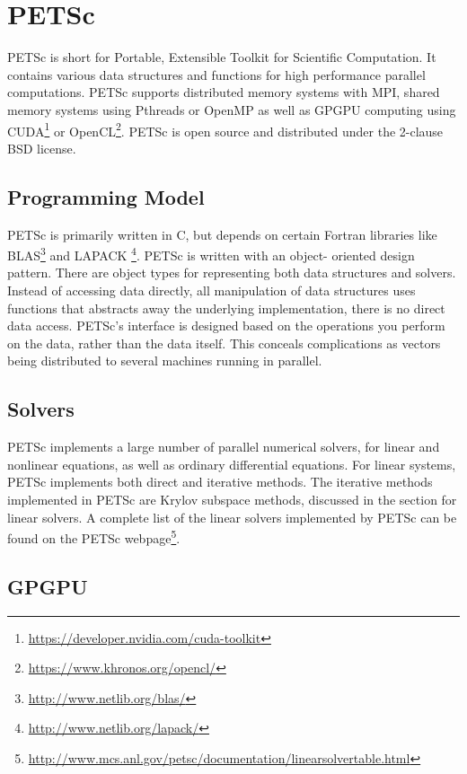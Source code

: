 \section{PETSc}

PETSc is short for Portable, Extensible Toolkit for Scientific Computation. 
It contains various data structures and functions for 
high performance parallel computations. PETSc supports distributed 
memory systems with MPI, shared memory systems using Pthreads or OpenMP as well 
as GPGPU computing using CUDA\footnote{\url{https://developer.nvidia.com/cuda-toolkit}} 
or OpenCL\footnote{\url{https://www.khronos.org/opencl/}}. PETSc is open source and distributed 
under the 2-clause BSD license\cite{petsc-web-page}.

\subsection{Programming Model}

PETSc is primarily written in C, but depends on certain Fortran libraries like 
BLAS\footnote{\url{http://www.netlib.org/blas/}} and LAPACK
\footnote{\url{http://www.netlib.org/lapack/}}. PETSc is written with an object-
oriented design pattern. There are object types for representing both data structures 
and solvers. Instead of accessing data directly, all manipulation of data structures 
uses functions that abstracts away the underlying implementation, there is no direct 
data access. PETSc's interface is designed based on the operations you perform on 
the data, rather than the data itself. This conceals complications as vectors being 
distributed to several machines running in parallel.

\subsection{Solvers}

PETSc implements a large number of parallel numerical solvers, for linear and 
nonlinear equations, as well as ordinary differential equations. For linear systems, 
PETSc implements both direct and iterative methods. The iterative methods implemented 
in PETSc are Krylov subspace methods, discussed in the section for linear solvers.
A complete list of the linear solvers implemented by PETSc can be found on the 
PETSc webpage\footnote{\url{http://www.mcs.anl.gov/petsc/documentation/linearsolvertable.html}}.

\subsection{GPGPU}


